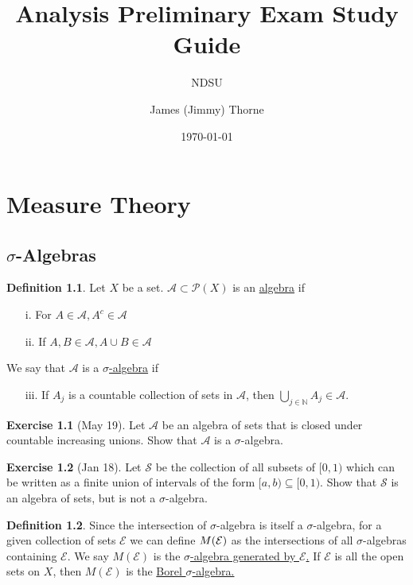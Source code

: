 \documentclass[12pt]{book}
\title{Analysis Preliminary Exam Study Guide}
\subtitle{NDSU}
\author{James (Jimmy) Thorne}
\date{\today}
\newcommand{\nn}{\mathbb{N}}
\theoremstyle{definition}
\newtheorem{define}{Definition}
\newtheorem{ex}{Exercise}
\begin{document}
	\maketitle
	
	\chapter{Measure Theory}
	
	\section{$\sigma$-Algebras}
	
	\begin{define}
		Let $X$ be a set.  $\mathcal{A}\subset \mathcal{P}(X)$ is an \underline{algebra} if 
		\begin{enumerate}
			\item[i. ] For $A\in \mathcal{A}, A^c \in \mathcal{A}$
			\item[ii. ] If $A,B\in \mathcal{A}, A\cup B \in \mathcal{A}$
		\end{enumerate}
	We say that $\mathcal{A}$ is a \underline{$\sigma$-algebra} if
		\begin{enumerate}
			\item[iii. ] If $A_j$ is a countable collection of sets in $\mathcal{A}$, then $\bigcup_{j\in \nn} A_j \in \mathcal{A}$.
	\end{enumerate} 
\end{define}

	\begin{ex}[May 19]
		Let $\mathcal{A}$ be an algebra of sets that is closed under countable increasing unions.  Show that
		$\mathcal{A}$ is a $\sigma$-algebra.
	\end{ex}

	\begin{ex}[Jan 18]
		Let $\mathcal{S}$ be the collection of all subsets of $[0,1)$ which can be written as a finite union
		of intervals of the form $[a,b) \subseteq [0,1).$  Show that $\mathcal{S}$ is an algebra of sets, but is not 
		a $\sigma$-algebra.
	\end{ex}
	
	\begin{define}
	Since the intersection of $\sigma$-algebra is itself a $\sigma$-algebra, for
	a given collection of sets $\mathcal{E}$  we can define $\mathnormal{M}(\mathcal{E})$ as the intersections of
	all $\sigma$-algebras containing  $\mathcal{E}$.  We say $M(\mathcal{E})$ is the \underline{$\sigma$-algebra generated by 
	$\mathcal{E}$.}  If $\mathcal{E}$ is all the open sets on $X$, then $M(\mathcal{E})$ is the \underline{Borel $\sigma$-algebra.}
	\end{define}
\end{document}
